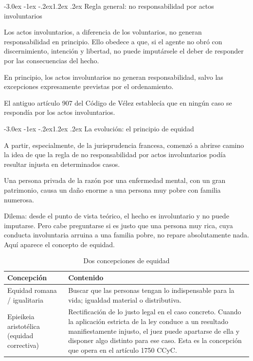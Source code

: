 \documentclass[12pt,oneside]{book}
\makeatletter
\renewcommand\section{\@startsection{section}{1}{\z@}%
  {-3.0ex \@plus -1ex \@minus -.2ex}{1.2ex \@plus .2ex}%
  {\normalfont\large\bfseries\color{acento}}}
\makeatother
\begin{document}
\section{Regla general: no responsabilidad por actos involuntarios}

Los actos involuntarios, a diferencia de los voluntarios, no generan responsabilidad en principio. Ello obedece a que, si el agente no obró con discernimiento, intención y libertad, no puede imputársele el deber de responder por las consecuencias del hecho.

\begin{importante}
En principio, los actos involuntarios no generan responsabilidad, salvo las excepciones expresamente previstas por el ordenamiento.
\end{importante}

El antiguo artículo 907 del Código de Vélez establecía que en ningún caso se respondía por los actos involuntarios.

\section{La evolución: el principio de equidad}

A partir, especialmente, de la jurisprudencia francesa, comenzó a abrirse camino la idea de que la regla de no responsabilidad por actos involuntarios podía resultar injusta en determinados casos.

\begin{ejemplo}
Una persona privada de la razón por una enfermedad mental, con un gran patrimonio, causa un daño enorme a una persona muy pobre con familia numerosa.

Dilema: desde el punto de vista teórico, el hecho es involuntario y no puede imputarse. Pero cabe preguntarse si es justo que una persona muy rica, cuya conducta involuntaria arruina a una familia pobre, no repare absolutamente nada. Aquí aparece el concepto de equidad.
\end{ejemplo}

\begin{table}[H]
\centering
\caption{Dos concepciones de equidad}
\begin{tabularx}{\textwidth}{l X}
\toprule
\textbf{Concepción} & \textbf{Contenido} \\
\midrule
Equidad romana / igualitaria & Buscar que las personas tengan lo indispensable para la vida; igualdad material o distributiva. \\
Epieikeia aristotélica (equidad correctiva) & Rectificación de lo justo legal en el caso concreto. Cuando la aplicación estricta de la ley conduce a un resultado manifiestamente injusto, el juez puede apartarse de ella y disponer algo distinto para ese caso. Esta es la concepción que opera en el artículo 1750 CCyC. \\
\bottomrule
\end{tabularx}
\end{table}
\end{document}
